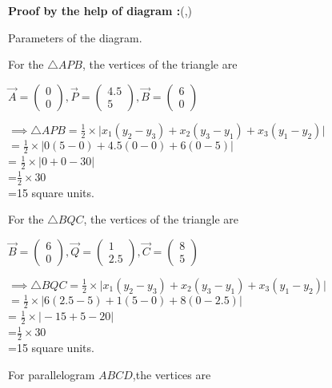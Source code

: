 \documentclass[12pt]{article}
\begin{document}
\textbf{Proof by the help of diagram :}(,)
\begin{table}[H]
	\centering
	
	\caption{Parameters  of the diagram.}
	\label{tab:tab:1}
\end{table}


For the $\triangle APB$, the vertices of the triangle are

   $\Vec{A}=\begin{pmatrix}
       0\\0
   \end{pmatrix},
   \Vec{P}=\begin{pmatrix}
       4.5\\5
   \end{pmatrix},
   \Vec{B}=\begin{pmatrix}
       6\\0
   \end{pmatrix}$


$\implies \triangle APB = \frac{1}{2}\times \big |x_1(y_2-y_3)+x_2(y_3-y_1)+x_3(y_1-y_2) \big|$\\
$ = \frac{1}{2} \times \big |0(5-0)+4.5(0-0)+6(0-5)\big|$\\
 = $\frac{1}{2} \times\big |0+0-30\big|$\\
 =$\frac{1}{2} \times30$\\
 =15  square units.


 For the $\triangle BQC$, the vertices of the triangle are
 
   $\Vec{B}=\begin{pmatrix}
       6\\0
   \end{pmatrix},
   \Vec{Q}=\begin{pmatrix}
       1\\2.5
   \end{pmatrix},
   \Vec{C}=\begin{pmatrix}
       8\\5
   \end{pmatrix}$

   
$\implies \triangle BQC = \frac{1}{2}\times \big |x_1(y_2-y_3)+x_2(y_3-y_1)+x_3(y_1-y_2) \big|$\\
$ = \frac{1}{2} \times \big |6(2.5-5)+1(5-0)+8(0-2.5)\big|$\\
 = $\frac{1}{2} \times\big |-15+5-20\big|$\\
 =$\frac{1}{2} \times30$\\
 =15  square units.

 
  For parallelogram $ABCD$,the vertices are
\end{document}
